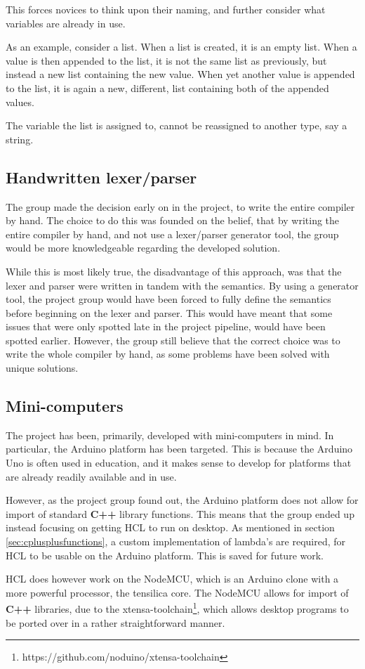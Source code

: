 This forces novices to think upon their naming, and further consider what variables are already in use.

As an example, consider a list.
When a list is created, it is an empty list.
When a value is then appended to the list, it is not the same list as previously, but instead a new list containing the new value.
When yet another value is appended to the list, it is again a new, different, list containing both of the appended values.

The variable the list is assigned to, cannot be reassigned to another type, say a string.

\subsection{Handwritten lexer/parser}
The group made the decision early on in the project, to write the entire compiler by hand.
The choice to do this was founded on the belief, that by writing the entire compiler by hand, and not use a lexer/parser generator tool, the group would be more knowledgeable regarding the developed solution.

While this is most likely true, the disadvantage of this approach, was that the lexer and parser were written in tandem with the semantics.
By using a generator tool, the project group would have been forced to fully define the semantics before beginning on the lexer and parser.
This would have meant that some issues that were only spotted late in the project pipeline, would have been spotted earlier.
However, the group still believe that the correct choice was to write the whole compiler by hand, as some problems have been solved with unique solutions.

\subsection{Mini-computers}
The project has been, primarily, developed with mini-computers in mind.
In particular, the Arduino platform has been targeted.
This is because the Arduino Uno is often used in education, and it makes sense to develop for platforms that are already readily available and in use.

However, as the project group found out, the Arduino platform does not allow for import of standard \textbf{C++} library functions.
This means that the group ended up instead focusing on getting HCL to run on desktop.
As mentioned in section \ref{sec:cplusplusfunctions}, a custom implementation of lambda's are required, for HCL to be usable on the Arduino platform.
This is saved for future work.

HCL does however work on the NodeMCU, which is an Arduino clone with a more powerful processor, the tensilica core.
The NodeMCU allows for import of \textbf{C++} libraries, due to the xtensa-toolchain\footnote{https://github.com/noduino/xtensa-toolchain}, which allows desktop programs to be ported over in a rather straightforward manner.


